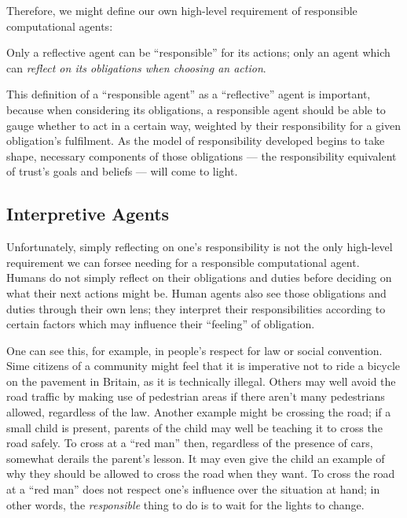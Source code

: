 Therefore, we might define our own high-level requirement of responsible computational agents:

\begin{displayquote}
    Only a reflective agent can be ``responsible'' for its actions; only an agent which can \emph{reflect on its obligations when choosing an action}.
\end{displayquote}\par

This definition of a ``responsible agent'' as a ``reflective'' agent is important, because when considering its obligations, a responsible agent should be able to gauge whether to act in a certain way, weighted by their responsibility for a given obligation's fulfilment. As the model of responsibility developed begins to take shape, necessary components of those obligations --- the responsibility equivalent of trust's goals and beliefs --- will come to light.\par

\subsection{Interpretive Agents}
Unfortunately, simply reflecting on one's responsibility is not the only high-level requirement we can forsee needing for a responsible computational agent. Humans do not simply reflect on their obligations and duties before deciding on what their next actions might be. Human agents also see those obligations and duties through their own lens; they interpret their responsibilities according to certain factors which may influence their ``feeling'' of obligation.\par

One can see this, for example, in people's respect for law or social convention. Sime citizens of a community might feel that it is imperative not to ride a bicycle on the pavement in Britain, as it is technically illegal. Others may well avoid the road traffic by making use of pedestrian areas if there aren't many pedestrians allowed, regardless of the law. Another example might be crossing the road; if a small child is present, parents of the child may well be teaching it to cross the road safely. To cross at a ``red man'' then, regardless of the presence of cars, somewhat derails the parent's lesson. It may even give the child an example of why they should be allowed to cross the road when they want. To cross the road at a ``red man'' does not respect one's influence over the situation at hand; in other words, the \emph{responsible} thing to do is to wait for the lights to change.\par

